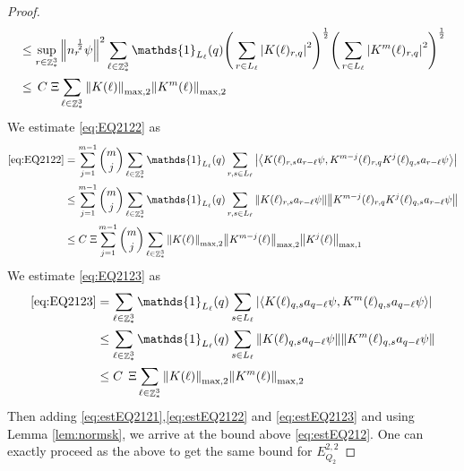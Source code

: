 \documentclass[sn-mathphys, Numbered ,a4paper]{sn-jnl}%
\DeclareMathOperator{\Z}{\mathbb{Z}}
\newcommand{\half}{\frac{1}{2}}
\newcommand{\eva}[1]{\left\langle #1 \right\rangle}
\theoremstyle{plain}
\theoremstyle{definition}
\theoremstyle{remark}
\theoremstyle{plain}
\theoremstyle{definition}
\theoremstyle{remark}
\begin{document}
\begin{proof}
\begin{align}
	&\leq \sup\limits_{r\in \Z^3_*} \norm{n_r^{\,\half}\psi}^2 \sum\limits_{\ell \in \Z^3_*} \mathds{1}_{L_{\ell}}(q) \Bigg(\sum\limits_{r\in L_{\ell}} \abs{ K(\ell)_{r,q} }^2\Bigg)^\half \Bigg(\sum\limits_{r\in L_{\ell}}\abs{ K^m(\ell)_{r,q} }^2\Bigg)^\half\nonumber\\
    &\leq \, C\; \Xi \sum\limits_{\ell \in \Z^3_*} \norm{K(\ell)}_{\mathrm{max,2}} \norm{K^m(\ell)}_{\mathrm{max,2}}  \label{eq:estEQ2121}
    \end{align}
We estimate \eqref{eq:EQ2122} as
\begin{align}
     \eqref{eq:EQ2122}
    &=\sum\limits_{j=1}^{m-1} {{m}\choose j} \sum\limits_{\ell \in \Z^3_*}\mathds{1}_{L_{\ell}}(q) \sum\limits_{r,s\in L_{\ell}}  \abs{\eva{ K(\ell)_{r,s} a_{r-\ell}\psi, K^{m-j}(\ell)_{r,q} K^{j}(\ell)_{q,s} a_{r-\ell} \psi }}\nonumber\\
    &\leq \sum\limits_{j=1}^{m-1} {{m}\choose j} \sum\limits_{\ell \in \Z^3_*}\mathds{1}_{L_{\ell}}(q) \sum\limits_{r,s\in L_{\ell}}  \norm{ K(\ell)_{r,s} a_{r-\ell}\psi}\norm{ K^{m-j}(\ell)_{r,q} K^{j}(\ell)_{q,s} a_{r-\ell} \psi } \nonumber\\
    &\leq C\;\Xi \sum\limits_{j=1}^{m-1} {{m}\choose j}\sum\limits_{\ell \in \Z^3_*} \norm{K(\ell)}_{\mathrm{max,2}} \norm{K^{m-j}(\ell)}_{\mathrm{max,2}} \norm{K^j(\ell)}_{\mathrm{max,1}} \label{eq:estEQ2122}
    \end{align}
    We estimate \eqref{eq:EQ2123} as 
    \begin{align}
    	\eqref{eq:EQ2123}
    	&=\sum\limits_{\ell \in \Z^3_*} \mathds{1}_{L_{\ell}}(q) \sum\limits_{ s \in L_{\ell}} \abs{\eva{K(\ell)_{q,s} a_{q-\ell} \psi, K^m(\ell)_{q,s}  a_{q-\ell} \psi }} \nonumber\\
    	&\leq \sum\limits_{\ell \in \Z^3_*} \mathds{1}_{L_{\ell}}(q) \sum\limits_{ s \in L_{\ell}} \norm{K(\ell)_{q,s} a_{q-\ell} \psi}\norm{ K^m(\ell)_{q,s}  a_{q-\ell} \psi } \nonumber\\
    	&\leq C\; \,\Xi \sum\limits_{\ell \in \Z^3_*} \norm{K(\ell)}_{\mathrm{max,2}} \norm{K^m(\ell)}_{\mathrm{max,2}} \label{eq:estEQ2123}
    \end{align} 
Then adding \eqref{eq:estEQ2121},\eqref{eq:estEQ2122} and \eqref{eq:estEQ2123} and using Lemma \ref{lem:normsk}, we arrive at the bound above \eqref{eq:estEQ212}. One can exactly proceed as the above to get the same bound for $E_{Q_2}^{2,2}$
\end{proof}
\end{document}
